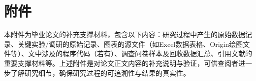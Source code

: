 \chapter*{附\quad 件}
\par{本附件为毕业论文的补充支撑材料，包含以下内容：研究过程中产生的原始数据记录、关键实验/调研的原始记录、图表的源文件（如Excel数据表格、Origin绘图文件等）、文中涉及的程序代码（若有）、调查问卷样本及回收数据汇总、引用文献的重要支撑材料等。上述附件是对论文正文内容的补充说明与验证，可供查阅者进一步了解研究细节，确保研究过程的可追溯性与结果的真实性。}